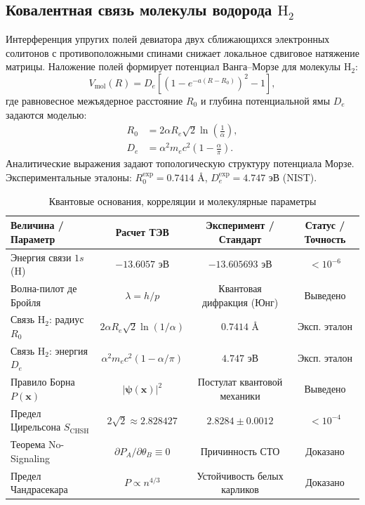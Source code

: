 \documentclass[11pt,a4paper]{article}
\theoremstyle{definition}
\theoremstyle{remark}
\begin{document}
\subsection{Ковалентная связь молекулы водорода $\mathrm{H}_2$}
Интерференция упругих полей девиатора двух сближающихся электронных солитонов с противоположными спинами снижает локальное сдвиговое натяжение матрицы. Наложение полей формирует потенциал Ванга--Морзе для молекулы $\mathrm{H}_2$:
\begin{equation}
    V_{\mathrm{mol}}(R) = D_e \left[ \left( 1 - e^{-a(R - R_0)} \right)^2 - 1 \right],
\end{equation}
где равновесное межъядерное расстояние $R_0$ и глубина потенциальной ямы $D_e$ задаются моделью:
\begin{align}
    R_0 &= 2 \alpha R_e \sqrt{2} \ln\left( \frac{1}{\alpha} \right), \\
    D_e &= \alpha^2 m_e c^2 \left( 1 - \frac{\alpha}{\pi} \right).
\end{align}
Аналитические выражения задают топологическую структуру потенциала Морзе. Экспериментальные эталоны: $R_0^{\mathrm{exp}} = 0.7414\text{ \AA}$, $D_e^{\mathrm{exp}} = 4.747\text{ эВ}$ (NIST).

\begin{table}[H]
\centering
\small
\caption{Квантовые основания, корреляции и молекулярные параметры}
\label{tab:quantum_foundations}
\vspace{2mm}
\begin{tabular}{lccc}
\toprule
\textbf{Величина / Параметр} & \textbf{Расчет ТЭВ} & \textbf{Эксперимент / Стандарт} & \textbf{Статус / Точность} \\
\midrule
Энергия связи $1s$ (H) & $-13.6057$ эВ & $-13.605693$ эВ & $< 10^{-6}$ \\
Волна-пилот де Бройля & $\lambda = h/p$ & Квантовая дифракция (Юнг) & Выведено \\
Связь $\mathrm{H}_2$: радиус $R_0$ & $2\alpha R_e\sqrt{2}\ln(1/\alpha)$ & $0.7414$ \AA & Эксп. эталон \\
Связь $\mathrm{H}_2$: энергия $D_e$ & $\alpha^2 m_e c^2(1-\alpha/\pi)$ & $4.747$ эВ & Эксп. эталон \\
Правило Борна $P(\mathbf{x})$ & $|\boldsymbol{\psi}(\mathbf{x})|^2$ & Постулат квантовой механики & Выведено \\
Предел Цирельсона $S_{\mathrm{CHSH}}$ & $2\sqrt{2} \approx 2.828427$ & $2.8284 \pm 0.0012$ & $< 10^{-4}$ \\
Теорема No-Signaling & $\partial P_A / \partial \theta_B \equiv 0$ & Причинность СТО & Доказано \\
Предел Чандрасекара & $P \propto n^{4/3}$ & Устойчивость белых карликов & Доказано \\
\bottomrule
\end{tabular}
\end{table}
\end{document}
